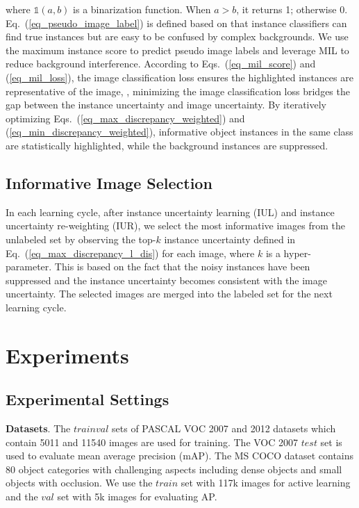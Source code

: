 \documentclass[final]{cvpr}
\begin{document}
where $\mathbb{1}(a, b)$ is a binarization function. When $a > b$, it returns 1; otherwise 0. 
Eq.~(\ref{eq_pseudo_image_label}) is defined based on that instance classifiers can find true instances but are easy to be confused by complex backgrounds. We use the maximum instance score to predict pseudo image labels and leverage MIL to reduce background interference.
According to Eqs.~(\ref{eq_mil_score}) and (\ref{eq_mil_loss}), the image classification loss ensures the highlighted instances are representative of the image, \ie, minimizing the image classification loss bridges the gap between the instance uncertainty and image uncertainty. By iteratively optimizing Eqs.~(\ref{eq_max_discrepancy_weighted}) and (\ref{eq_min_discrepancy_weighted}), informative object instances in the same class are statistically highlighted, while the background instances are suppressed. 

\subsection{Informative Image Selection}
\label{sec:topk}
In each learning cycle, after instance uncertainty learning (IUL) and instance uncertainty re-weighting (IUR), we select the most informative images from the unlabeled set by observing the top-$k$ instance uncertainty defined in Eq.~(\ref{eq_max_discrepancy_l_dis}) for each image, where $k$ is a hyper-parameter. This is based on the fact that the noisy instances have been suppressed and the instance uncertainty becomes consistent with the image uncertainty. The selected images are merged into the labeled set for the next learning cycle.

\section{Experiments}
\subsection{Experimental Settings}

\textbf{Datasets}. The $trainval$ sets of PASCAL VOC 2007 and 2012 datasets which contain 5011 and 11540 images are used for training. The VOC 2007 $test$ set is used to evaluate mean average precision (mAP). The MS COCO dataset contains 80 object categories with challenging aspects including dense objects and small objects with occlusion. We use the $train$ set with 117k images for active learning and the $val$ set with 5k images for evaluating AP.
\end{document}
